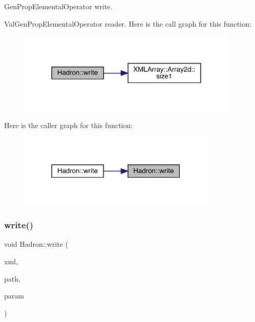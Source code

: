 Gen\+Prop\+Elemental\+Operator write. 

Val\+Gen\+Prop\+Elemental\+Operator reader. Here is the call graph for this function\+:\nopagebreak
\begin{figure}[H]
\begin{center}
\leavevmode
\includegraphics[width=298pt]{d1/daf/namespaceHadron_a276bd4448f8f6233aa951856e912651e_cgraph}
\end{center}
\end{figure}
Here is the caller graph for this function\+:\nopagebreak
\begin{figure}[H]
\begin{center}
\leavevmode
\includegraphics[width=267pt]{d1/daf/namespaceHadron_a276bd4448f8f6233aa951856e912651e_icgraph}
\end{center}
\end{figure}
\mbox{\label{namespaceHadron_ab67658d0abad845f6efa3ba94de7692c}} 
\subsubsection{\texorpdfstring{write()}{write()}\hspace{0.1cm}{\footnotesize\ttfamily [76/95]}}
{\footnotesize\ttfamily void Hadron\+::write (\begin{DoxyParamCaption}\item[{\mbox{\hyperlink{classADATXML_1_1XMLWriter}{X\+M\+L\+Writer}} \&}]{xml,  }\item[{const std\+::string \&}]{path,  }\item[{const \mbox{\hyperlink{structHadron_1_1KeyHadronNode__t}{Key\+Hadron\+Node\+\_\+t}} \&}]{param }\end{DoxyParamCaption})}



